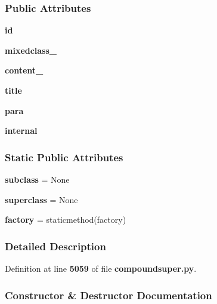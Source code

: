 \subsubsection*{Public Attributes}
\begin{DoxyCompactItemize}
\item 
{\bf id}
\item 
{\bf mixedclass\+\_\+}
\item 
{\bf content\+\_\+}
\item 
{\bf title}
\item 
{\bf para}
\item 
{\bf internal}
\end{DoxyCompactItemize}
\subsubsection*{Static Public Attributes}
\begin{DoxyCompactItemize}
\item 
{\bf subclass} = None
\item 
{\bf superclass} = None
\item 
{\bf factory} = staticmethod(factory)
\end{DoxyCompactItemize}


\subsubsection{Detailed Description}


Definition at line {\bf 5059} of file {\bf compoundsuper.\+py}.



\subsubsection{Constructor \& Destructor Documentation}
